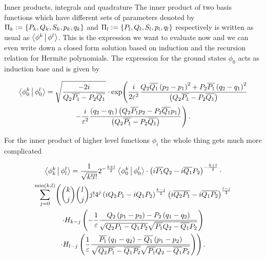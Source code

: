 \begin{chapter}{Inner products, integrals and quadrature}
The inner product of two basis functions which have different sets of
parameters denoted by $\Pi_k := \{P_k, Q_k, S_k, p_k, q_k\}$ and
$\Pi_l := \{P_l, Q_l, S_l, p_l, q_l\}$ respectively is written as usual as
$\Braket{ \phi^k | \phi^l }$. This is the expression we want to evaluate now and
we can even write down a closed form solution based on induction and the recursion
relation for Hermite polynomials. The expression for the ground states $\phi_0$
acts as induction base and is given by

\begin{multline} \label{eq:multifamily_innerp_ground}
  \Braket{ \phi_0^k | \phi_0^l } =
  \sqrt{\frac{-2 i}{Q_2 \overline{P_1} - P_2 \overline{Q_1}}} \cdot
    \exp \Biggl(
      \frac{i}{2 \varepsilon^2}
      \frac{Q_2 \overline{Q_1} \left(p_2-p_1\right)^2 + P_2 \overline{P_1} \left(q_2-q_1\right)^2}
            {\left(Q_2 \overline{P_1} - P_2 \overline{Q_1}\right)}
    \\
    -\frac{i}{\varepsilon^2}
    \frac{\left(q_2-q_1\right) \left( Q_2 \overline{P_1} p_2 - P_2 \overline{Q_1} p_1\right)}
         {\left(Q_2 \overline{P_1} - P_2 \overline{Q_1}\right)}
    \Biggr) \,.
\end{multline}

For the inner product of higher level functions $\phi_i$ the whole thing gets much
more complicated

\begin{multline} \label{eq:mixing_braket}
  \Braket{ \phi_k^k | \phi_l^l } =
  \frac{1}{\sqrt{k!l!}} 2^{-\frac{k+l}{2}} \Braket{ \phi_0^k | \phi_0^l } \cdot
  \left(i \overline{ P_1} Q_2 - i \overline{Q_1} P_2\right)^{-\frac{k+l}{2}} \cdot \\
  \sum_{j=0}^{\min\left(k,l\right)}
    \Biggl(
      \binom{k}{j} \binom{l}{j} j! 4^j
      \left(i Q_2  P_1 - i Q_1  P_2\right)^{\frac{k-j}{2}}
      \left(i \overline{Q_2 P_1} - i\overline{Q_1 P_2}\right)^{\frac{l-j}{2}}
      \\
      \cdot H_{k-j}\left(-\frac{1}{\varepsilon}
                    \frac{Q_2\left(p_1-p_2\right)-P_2\left(q_1-q_2\right)}
                         {\sqrt{Q_2 P_1 - Q_1 P_2}\sqrt{\overline{P_1}Q_2-\overline{Q_1} P_2}}\right)
      \\
      \cdot H_{l-j}\left(\frac{1}{\varepsilon}
                   \frac{\overline{ P_1}\left(q_1-q_2\right)-\overline{Q_1}\left(p_1-p_2\right)}
                        {\sqrt{\overline{Q_2 P_1}-\overline{Q_1 P_2}}\sqrt{\overline{ P_1}Q_2-\overline{Q_1} P_2}}\right)
    \Biggr) \,.
\end{multline}


\end{chapter}
